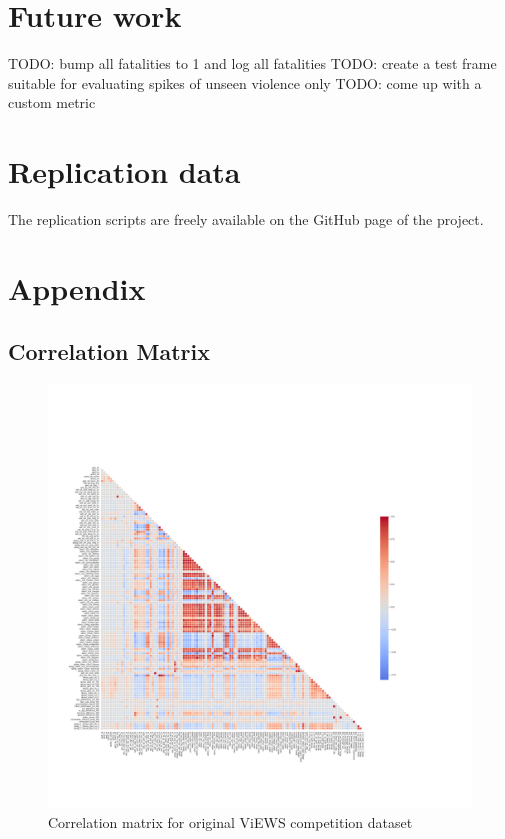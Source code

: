 \documentclass[runningheads]{llncs}
\begin{document}
    \section{Future work}
    TODO: bump all fatalities to 1 and log all fatalities
    TODO: create a test frame suitable for evaluating spikes of unseen violence only
    TODO: come up with a custom metric


    \section{Replication data}
    The replication scripts are freely available on the GitHub page of the project.


    \section{Appendix}

    \subsection{Correlation Matrix}
    \label{sec:corr_mat}

    \begin{figure}[h]
        \includegraphics[width=\textwidth]{Figures/correlation_matrix.png}
        \centering
        \caption{Correlation matrix for original ViEWS competition dataset}
    \end{figure}
\end{document}
